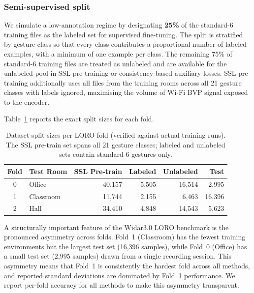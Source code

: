 \documentclass[journal]{IEEEtran}
\begin{document}
\subsubsection*{Semi-supervised split}
We simulate a low-annotation regime by designating \textbf{25\%} of
the standard-6 training files as the labeled set for supervised
fine-tuning.
The split is stratified by gesture class so that every class
contributes a proportional number of labeled examples, with a minimum
of one example per class.
The remaining 75\% of standard-6 training files are treated as
unlabeled and are available for the unlabeled pool in SSL pre-training
or consistency-based auxiliary losses.
SSL pre-training additionally uses all files from the training rooms
across all 21 gesture classes with labels ignored, maximising the
volume of Wi-Fi BVP signal exposed to the encoder.

Table~\ref{tab:splits} reports the exact split sizes for each fold.

\begin{table}[t]
  \centering
  \caption{Dataset split sizes per LORO fold (verified against actual
           training runs). The SSL pre-train set spans all 21 gesture
           classes; labeled and unlabeled sets contain standard-6
           gestures only.}
  \label{tab:splits}
  \renewcommand{\arraystretch}{1.15}
  \begin{tabular}{@{}clrrrr@{}}
    \toprule
    \textbf{Fold} & \textbf{Test Room} &
    \textbf{SSL Pre-train} & \textbf{Labeled} &
    \textbf{Unlabeled} & \textbf{Test} \\
    \midrule
    0 & Office    & 40{,}157 & 5{,}505 & 16{,}514 &  2{,}995 \\
    1 & Classroom & 11{,}744 & 2{,}155 &  6{,}463 & 16{,}396 \\
    2 & Hall      & 34{,}410 & 4{,}848 & 14{,}543 &  5{,}623 \\
    \bottomrule
  \end{tabular}
\end{table}

A structurally important feature of the Widar3.0 LORO benchmark is
the pronounced asymmetry across folds.
Fold~1 (Classroom) has the fewest training environments but the
largest test set (16{,}396 samples), while Fold~0 (Office) has a
small test set (2{,}995 samples) drawn from a single recording
session.
This asymmetry means that Fold~1 is consistently the hardest fold
across all methods, and reported standard deviations are dominated
by Fold~1 performance.
We report per-fold accuracy for all methods to make this asymmetry
transparent.
\end{document}
